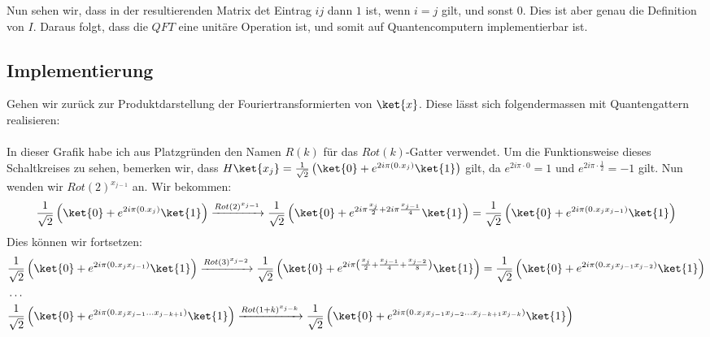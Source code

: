 Nun sehen wir, dass in der resultierenden Matrix det Eintrag $ij$ dann $1$ ist, wenn $i = j$ gilt, und sonst $0$. Dies ist aber genau die Definition von $I$. Daraus folgt, dass die $QFT$ eine unitäre Operation ist, und somit auf Quantencomputern implementierbar ist.

\subsection{Implementierung}

Gehen wir zurück zur Produktdarstellung der Fouriertransformierten von $\ket{x}$. Diese lässt sich folgendermassen mit Quantengattern realisieren:
\paragraph{}
{
\scriptsize

}
\paragraph{}
In dieser Grafik habe ich aus Platzgründen den Namen $R(k)$ für das $Rot(k)$-Gatter verwendet. Um die Funktionsweise dieses Schaltkreises zu sehen, bemerken wir, dass $H\ket{x_j} = \frac{1}{\sqrt{2}}\left(\ket{0} + e^{2i\pi(0.x_j)}\ket{1}\right)$ gilt, da $e^{2i\pi\cdot 0} = 1$ und $e^{2i\pi\cdot\frac{1}{2}} = -1$ gilt. Nun wenden wir $Rot(2)^{x_{j - 1}}$ an. Wir bekommen:
$$\frac{1}{\sqrt{2}}\left(\ket{0} + e^{2i\pi(0.x_j)}\ket{1}\right) \xrightarrow{Rot(2)^{x_{j - 1}}} \frac{1}{\sqrt{2}}\left(\ket{0} + e^{2i\pi\frac{x_j}{2} + 2i\pi\frac{x_{j - 1}}{4}}\ket{1}\right) = \frac{1}{\sqrt{2}}\left(\ket{0} + e^{2i\pi(0.x_jx_{j - 1})}\ket{1}\right)$$
Dies können wir fortsetzen: 
\begin{align*}
&\frac{1}{\sqrt{2}}\left(\ket{0} + e^{2i\pi(0.x_jx_{j - 1})}\ket{1}\right) \xrightarrow{Rot(3)^{x_{j - 2}}} \frac{1}{\sqrt{2}}\left(\ket{0} + e^{2i\pi\left(\frac{x_j}{2} + \frac{x_{j - 1}}{4} + \frac{x_{j - 2}}{8}\right)}\ket{1}\right) = \frac{1}{\sqrt{2}}\left(\ket{0} + e^{2i\pi(0.x_jx_{j - 1}x_{j - 2})}\ket{1}\right) \\ &\dots \\ &\frac{1}{\sqrt{2}}\left(\ket{0} + e^{2i\pi(0.x_jx_{j - 1}\dots x_{j - k + 1})}\ket{1}\right) \xrightarrow{Rot(1 + k)^{x_{j - k}}} \frac{1}{\sqrt{2}}\left(\ket{0} + e^{2i\pi(0.x_jx_{j - 1}x_{j - 2}\dots x_{j - k + 1} x_{j - k})}\ket{1}\right)
\end{align*}

